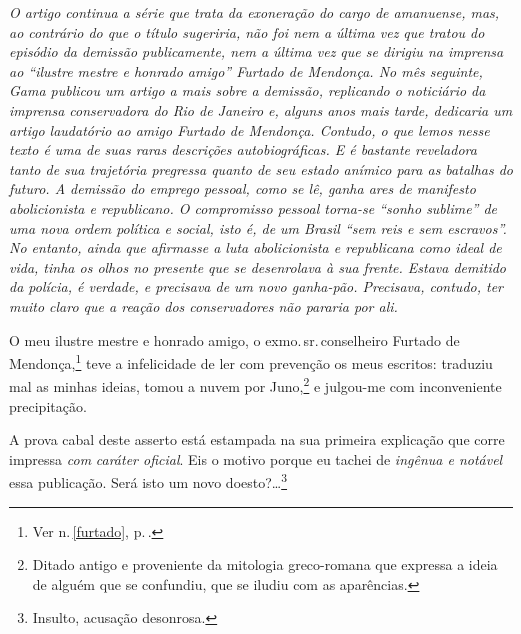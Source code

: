 \begin{didascalia}\itshape
O artigo continua a série que trata da exoneração do cargo de amanuense,
mas, ao contrário do que o título sugeriria, não foi nem a última vez
que tratou do episódio da demissão publicamente, nem a última vez que se
dirigiu na imprensa ao ``ilustre mestre e honrado amigo'' Furtado de
Mendonça. No mês seguinte, Gama publicou um artigo a mais sobre a
demissão, replicando o noticiário da imprensa conservadora do Rio de
Janeiro e, alguns anos mais tarde, dedicaria um artigo laudatório ao
amigo Furtado de Mendonça. Contudo, o que lemos nesse texto é uma de
suas raras descrições autobiográficas. E é bastante reveladora tanto de
sua trajetória pregressa quanto de seu estado anímico para as batalhas
do futuro. A demissão do emprego pessoal, como se lê, ganha ares de
manifesto abolicionista e republicano. O compromisso pessoal torna-se
``sonho sublime'' de uma nova ordem política e social, isto é, de um
Brasil ``sem reis e sem escravos''. No entanto, ainda que afirmasse a luta
abolicionista e republicana como ideal de vida, tinha os olhos no
presente que se desenrolava à sua frente. Estava demitido da polícia, é
verdade, e precisava de um novo ganha-pão. Precisava, contudo, ter muito
claro que a reação dos conservadores não pararia por ali.
\end{didascalia}



O meu ilustre mestre e honrado amigo, o exmo.\,sr.\,conselheiro Furtado de
Mendonça,\footnote{Ver n.\,\ref{furtado}, p.\,\pageref{furtado}.} teve a
infelicidade de ler com prevenção os meus escritos: traduziu mal as
minhas ideias, tomou a nuvem por Juno,\footnote{Ditado antigo e
  proveniente da mitologia greco-romana que expressa a ideia de alguém
  que se confundiu, que se iludiu com as aparências.} e julgou-me com
inconveniente precipitação.

A prova cabal deste asserto está estampada na sua primeira explicação
que corre impressa \emph{com} \emph{caráter oficial}. Eis o motivo
porque eu tachei de \emph{ingênua e notável} essa publicação. Será isto
um novo doesto?\ldots{}\footnote{Insulto, acusação desonrosa.}

